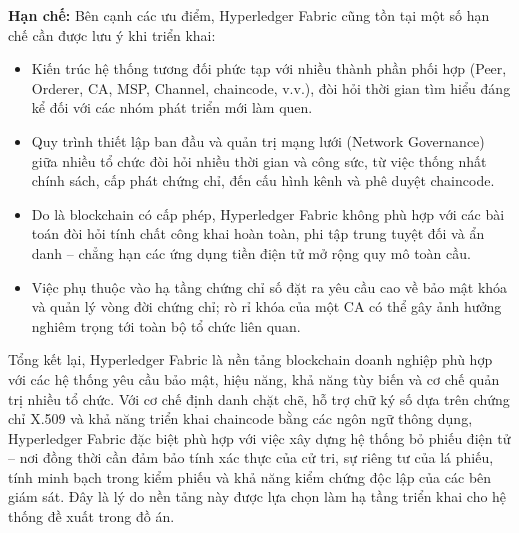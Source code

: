 \textbf{Hạn chế:} Bên cạnh các ưu điểm, Hyperledger Fabric cũng tồn tại một số hạn chế cần được lưu ý khi triển khai:

\begin{itemize}
    \item Kiến trúc hệ thống tương đối phức tạp với nhiều thành phần phối hợp (Peer, Orderer, CA, MSP, Channel, chaincode, v.v.), đòi hỏi thời gian tìm hiểu đáng kể đối với các nhóm phát triển mới làm quen.

    \item Quy trình thiết lập ban đầu và quản trị mạng lưới (Network Governance) giữa nhiều tổ chức đòi hỏi nhiều thời gian và công sức, từ việc thống nhất chính sách, cấp phát chứng chỉ, đến cấu hình kênh và phê duyệt chaincode.

    \item Do là blockchain có cấp phép, Hyperledger Fabric không phù hợp với các bài toán đòi hỏi tính chất công khai hoàn toàn, phi tập trung tuyệt đối và ẩn danh -- chẳng hạn các ứng dụng tiền điện tử mở rộng quy mô toàn cầu.

    \item Việc phụ thuộc vào hạ tầng chứng chỉ số đặt ra yêu cầu cao về bảo mật khóa và quản lý vòng đời chứng chỉ; rò rỉ khóa của một CA có thể gây ảnh hưởng nghiêm trọng tới toàn bộ tổ chức liên quan.
\end{itemize}

Tổng kết lại, Hyperledger Fabric là nền tảng blockchain doanh nghiệp phù hợp với các hệ thống yêu cầu bảo mật, hiệu năng, khả năng tùy biến và cơ chế quản trị nhiều tổ chức. Với cơ chế định danh chặt chẽ, hỗ trợ chữ ký số dựa trên chứng chỉ X.509 và khả năng triển khai chaincode bằng các ngôn ngữ thông dụng, Hyperledger Fabric đặc biệt phù hợp với việc xây dựng hệ thống bỏ phiếu điện tử -- nơi đồng thời cần đảm bảo tính xác thực của cử tri, sự riêng tư của lá phiếu, tính minh bạch trong kiểm phiếu và khả năng kiểm chứng độc lập của các bên giám sát. Đây là lý do nền tảng này được lựa chọn làm hạ tầng triển khai cho hệ thống đề xuất trong đồ án.
